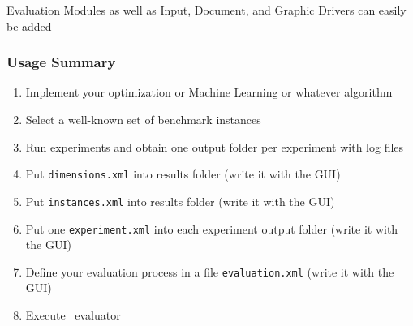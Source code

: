 \begin{frame}[b,label=maxSatInteractiveDemoEnd]
{\begin{small}
\begin{itemize}
{{%
}%
%
\item<24-> Evaluation Modules as well as Input, Document, and Graphic Drivers can easily be added%
%
%
}%
%
\end{itemize}%
\end{small}}%
%
\end{frame}%
%
%
\begin{frame}%
\frametitle{Usage Summary}%
\begin{enumerate}%
\item Implement your optimization or Machine Learning or whatever algorithm%
\item<2-> Select a well-known set of benchmark instances%
\item<3-> Run experiments and obtain one output folder per experiment with log files\medskip%
\item<4-> Put \texttt{dimensions.xml} into results folder (write it with the GUI)%
\item<5-> Put \texttt{instances.xml} into results folder (write it with the GUI)%
\item<6-> Put one \texttt{experiment.xml} into each experiment output folder (write it with the GUI)%
\item<7-> Define your evaluation process in a file \texttt{evaluation.xml} (write it with the GUI)%
\item<8-> Execute \optimizationBenchmarking\ evaluator%
\end{enumerate}%
\end{frame}%
%